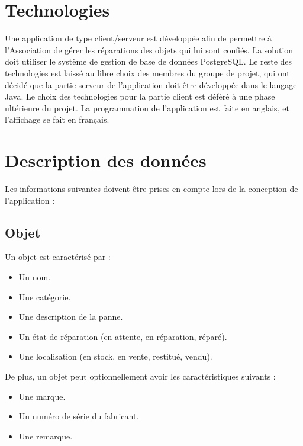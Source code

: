 \documentclass{article}
\begin{document}
\section{Technologies}
Une application de type client/serveur est développée afin de permettre à l'Association de gérer les réparations des objets qui lui sont confiés. La solution doit utiliser le système de gestion de base de données PostgreSQL. Le reste des technologies est laissé au libre choix des membres du groupe de projet, qui ont décidé que la partie serveur de l'application doit être développée dans le langage Java. Le choix des technologies pour la partie client est déféré à une phase ultérieure du projet. La programmation de l'application est faite en anglais, et l'affichage se fait en français.

\section{Description des données}
Les informations suivantes doivent être prises en compte lors de la conception de l'application :

\subsection*{Objet}
Un objet est caractérisé par :
\begin{itemize}
    \item Un nom.
    \item Une catégorie.
    \item Une description de la panne.
    \item Un état de réparation (en attente, en réparation, réparé).
    \item Une localisation (en stock, en vente, restitué, vendu).
\end{itemize}

De plus, un objet peut optionnellement avoir les caractéristiques suivants :
\begin{itemize}
    \item Une marque.
    \item Un numéro de série du fabricant.
    \item Une remarque.
\end{itemize}
\end{document}
